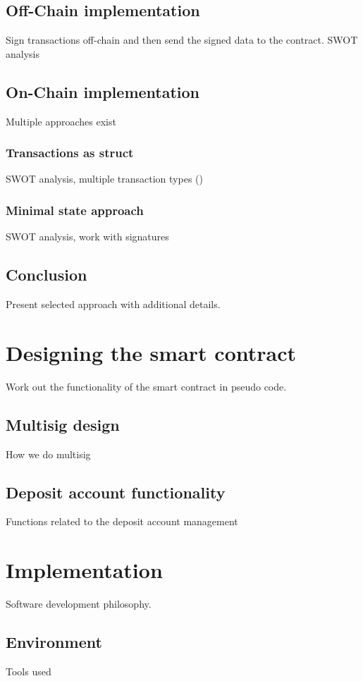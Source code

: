 \documentclass[12pt,a4paper,titlepage,oneside,english]{article}
\begin{document}
\subsection{Off-Chain implementation}
Sign transactions off-chain and then send the signed data to the contract. SWOT analysis
\subsection{On-Chain implementation}
Multiple approaches exist
\subsubsection{Transactions as struct}
SWOT analysis, multiple transaction types (\cite{GNOSISLtd.2019})
\subsubsection{Minimal state approach}
SWOT analysis, work with signatures
\subsection{Conclusion}
Present selected approach with additional details.



\section{Designing the smart contract}
Work out the functionality of the smart contract in pseudo code.
\subsection{Multisig design}
How we do multisig
\subsection{Deposit account functionality}
Functions related to the deposit account management



\section{Implementation}
Software development philosophy.
\subsection{Environment}
Tools used
\end{document}
